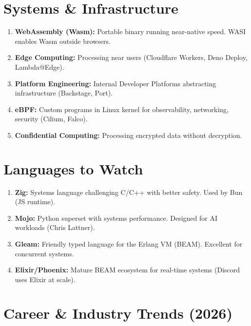 \documentclass[11pt, a4paper, oneside]{report}
\begin{document}
{{{{{{{{{{{{\section[Systems]{Systems \& Infrastructure}

\begin{enumerate}[leftmargin=*]
\item \textbf{WebAssembly (Wasm):} Portable binary running near-native speed. WASI enables Wasm outside browsers.
\item \textbf{Edge Computing:} Processing near users (Cloudflare Workers, Deno Deploy, Lambda@Edge).
\item \textbf{Platform Engineering:} Internal Developer Platforms abstracting infrastructure (Backstage, Port).
\item \textbf{eBPF:} Custom programs in Linux kernel for observability, networking, security (Cilium, Falco).
\item \textbf{Confidential Computing:} Processing encrypted data without decryption.
\end{enumerate}

\section[Languages]{Languages to Watch}

\begin{enumerate}[leftmargin=*]
\item \textbf{Zig:} Systems language challenging C/C++ with better safety. Used by Bun (JS runtime).
\item \textbf{Mojo:} Python superset with systems performance. Designed for AI workloads (Chris Lattner).
\item \textbf{Gleam:} Friendly typed language for the Erlang VM (BEAM). Excellent for concurrent systems.
\item \textbf{Elixir/Phoenix:} Mature BEAM ecosystem for real-time systems (Discord uses Elixir at scale).
\end{enumerate}

\section[Career Trends]{Career \& Industry Trends (2026)}

}}}}}}}}}}}}
\end{document}
